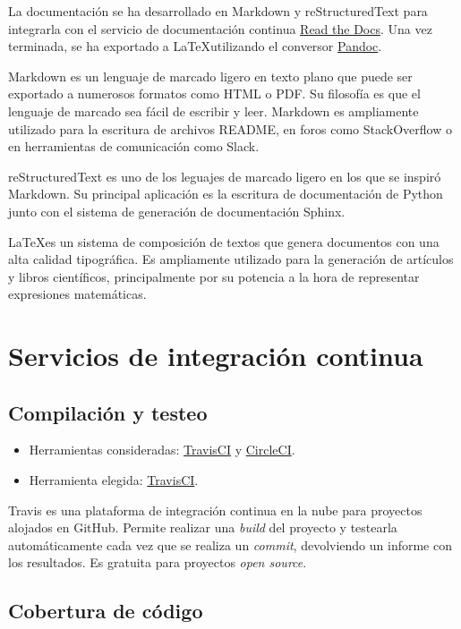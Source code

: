 La documentación se ha desarrollado en Markdown y reStructuredText para integrarla con el
servicio de documentación continua \href{https://readthedocs.org/}{Read
the Docs}. Una vez terminada, se ha exportado a \LaTeX utilizando el
conversor \href{http://pandoc.org/}{Pandoc}.

Markdown es un lenguaje de marcado ligero en texto plano que puede ser
exportado a numerosos formatos como HTML o PDF. Su filosofía es que el
lenguaje de marcado sea fácil de escribir y leer. Markdown es
ampliamente utilizado para la escritura de archivos README, en foros
como StackOverflow o en herramientas de comunicación como Slack.

reStructuredText es uno de los leguajes de marcado ligero en los que se 
inspiró Markdown. Su principal aplicación es la escritura de documentación 
de Python junto con el sistema de generación de documentación Sphinx.

\LaTeX es un sistema de composición de textos que genera documentos con
una alta calidad tipográfica. Es ampliamente utilizado para la
generación de artículos y libros científicos, principalmente por su
potencia a la hora de representar expresiones matemáticas.

\section{Servicios de integración
continua}\label{servicios-de-integraciuxf3n-continua}

\subsection{Compilación y testeo}\label{compilacion-y-testeo}

\begin{itemize}
\tightlist
\item
  Herramientas consideradas: \href{https://travis-ci.org/}{TravisCI} y
  \href{https://circleci.com/}{CircleCI}.
\item
  Herramienta elegida: \href{https://travis-ci.org/}{TravisCI}.
\end{itemize}

Travis es una plataforma de integración continua en la nube para
proyectos alojados en GitHub. Permite realizar una \emph{build} del
proyecto y testearla automáticamente cada vez que se realiza un
\emph{commit}, devolviendo un informe con los resultados. Es gratuita
para proyectos \emph{open source}.

\subsection{Cobertura de código}\label{cobertura-de-codigo}

